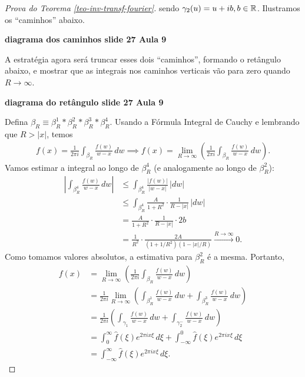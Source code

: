 \begin{proof}[Prova do Teorema \ref{teo-inv-transf-fourier}]
            sendo $\gamma_2(u) = u+ib, b\in\mathbb{R}$. Ilustramos os ``caminhos'' abaixo.
            \begin{center}
                {\bf diagrama dos caminhos slide 27 Aula 9}
            \end{center}
            A estratégia agora será truncar esses dois ``caminhos'', formando o retângulo abaixo, e mostrar que
            as integrais nos caminhos verticais vão para zero quando $R\to\infty$.
            \begin{center}
                {\bf diagrama do retângulo slide 27 Aula 9}
            \end{center}
            Defina $\beta_R \equiv \beta_R^1*\beta_R^2*\beta_R^3*\beta_R^4$. Usando a Fórmula Integral de Cauchy
            e lembrando que $R > |x|$, temos
            \begin{align*}
                f(x) = \frac{1}{2\pi i}\int_{\beta_R} \frac{f(w)}{w-x} \, dw
                \implies f(x) = \lim_{R\to\infty} \left( \frac{1}{2\pi i}\int_{\beta_R} \frac{f(w)}{w-x} \, dw \right).
            \end{align*}
            Vamos estimar a integral ao longo de $\beta_R^4$ (e analogamente ao longo de $\beta_R^2$):
            \begin{align*}
                \left| \int_{\beta_R^4} \frac{f(w)}{w-x} \, dw \right| 
                &\leq \int_{\beta_R^4} \frac{|f(w)|}{|w-x|} \, |dw| \\
                &\leq \int_{\beta_R^4} \frac{A}{1+R^2}\cdot\frac{1}{R-|x|} \, |dw| \\
                &= \frac{A}{1+R^2}\cdot\frac{1}{R-|x|}\cdot 2b \\
                &= \frac{1}{R^2}\cdot\frac{2A}{(1+1/R^2)(1-|x|/R)} \xrightarrow{R\to\infty} 0.
            \end{align*}
            Como tomamos valores absolutos, a estimativa para $\beta_R^2$ é a mesma. Portanto,
            \begin{align*}
                f(x) &= \lim_{R\to\infty} \left( \frac{1}{2\pi i}\int_{\beta_R} \frac{f(w)}{w-x} \, dw \right) \\
                     &= \frac{1}{2\pi i} \lim_{R\to\infty} \left( \int_{\beta_R^1} \frac{f(w)}{w-x} \, dw 
                        + \int_{\beta_R^3} \frac{f(w)}{w-x} \, dw \right) \\
                     &= \frac{1}{2\pi i}\left( \int_{\gamma_1} \frac{f(w)}{w-x} \, dw 
                        + \int_{\gamma_2^-} \frac{f(w)}{w-x} \, dw \right) \\
                     &= \int_{0}^{\infty} \widehat{f}(\xi) e^{2\pi ix\xi} \, d\xi 
                        + \int_{-\infty}^0 \widehat{f}(\xi) e^{2\pi ix\xi} \, d\xi \\
                     &= \int_{-\infty}^{\infty} \widehat{f}(\xi) e^{2\pi ix\xi} \, d\xi.
            \end{align*}
        \end{proof}
        
